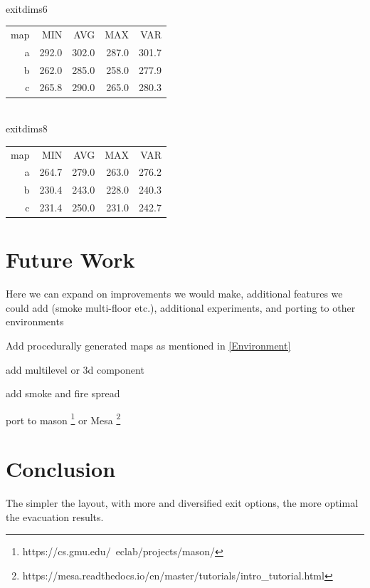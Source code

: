 \documentclass[12pt,letterpaper]{article}
\begin{document}
\\
exitdims6
\begin{tabular}{ r | r | r | r | r }
map & MIN   & AVG   & MAX   & VAR   \\
a   & 292.0 & 302.0 & 287.0 & 301.7 \\    
b   & 262.0 & 285.0 & 258.0 & 277.9 \\
c   & 265.8 & 290.0 & 265.0 & 280.3 \\
\end{tabular}
\\
exitdims8
\begin{tabular}{ r | r | r | r | r }
map &  MIN   &  AVG  & MAX   & VAR   \\
a   &  264.7 & 279.0 & 263.0 & 276.2 \\
b   &  230.4 & 243.0 & 228.0 & 240.3 \\
c   &  231.4 & 250.0 & 231.0 & 242.7 \\
\end{tabular}  

\section{Future Work}
Here we can expand on improvements we would make, additional features we could add (smoke multi-floor etc.), additional experiments, and porting to other environments

Add procedurally generated maps as mentioned in \ref{Environment}

add multilevel or 3d component

add smoke and fire spread

port to mason \footnote{https://cs.gmu.edu/~eclab/projects/mason/} or Mesa \footnote{https://mesa.readthedocs.io/en/master/tutorials/intro\_tutorial.html}

\section {Conclusion}

The simpler the layout, with more and diversified exit options, the more optimal
the evacuation results.




\end{document}
